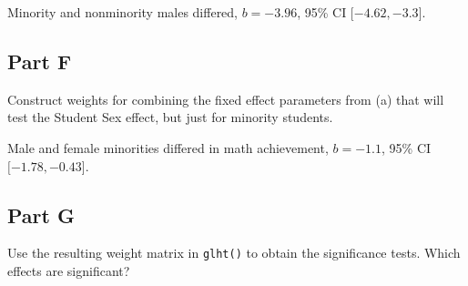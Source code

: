 \documentclass[]{article}
\newenvironment{Shaded}{\begin{snugshade}}{\end{snugshade}}
\newcommand{\KeywordTok}[1]{\textcolor[rgb]{0.13,0.29,0.53}{\textbf{#1}}}
\newcommand{\DataTypeTok}[1]{\textcolor[rgb]{0.13,0.29,0.53}{#1}}
\newcommand{\DecValTok}[1]{\textcolor[rgb]{0.00,0.00,0.81}{#1}}
\newcommand{\StringTok}[1]{\textcolor[rgb]{0.31,0.60,0.02}{#1}}
\newcommand{\OtherTok}[1]{\textcolor[rgb]{0.56,0.35,0.01}{#1}}
\newcommand{\OperatorTok}[1]{\textcolor[rgb]{0.81,0.36,0.00}{\textbf{#1}}}
\newcommand{\NormalTok}[1]{#1}
\begin{document}
Minority and nonminority males differed, \(b = -3.96\), 95\% CI
\([-4.62, -3.3\){]}.

\subsection{Part F}\label{part-f}

Construct weights for combining the fixed effect parameters from (a)
that will test the Student Sex effect, but just for minority students.

\begin{Shaded}
\end{Shaded}

Male and female minorities differed in math achievement, \(b = -1.1\),
95\% CI \([-1.78, -0.43\){]}.

\subsection{Part G}\label{part-g}

Use the resulting weight matrix in \texttt{glht()} to obtain the
significance tests. Which effects are significant?
\end{document}
